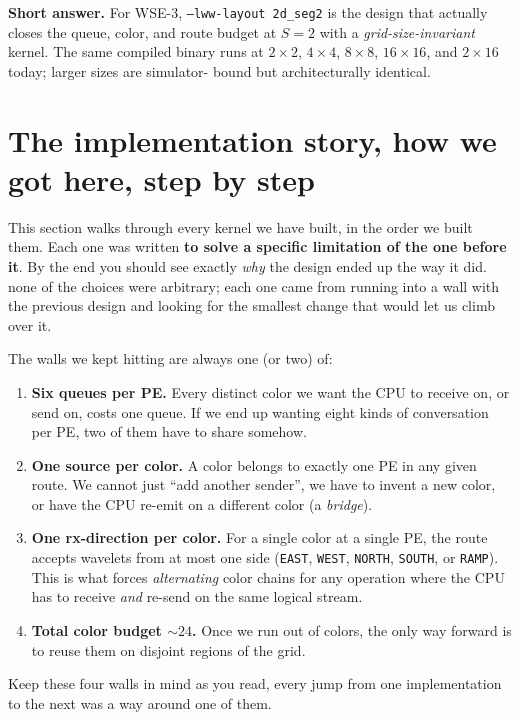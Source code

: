 \documentclass[11pt]{article}
\newcommand{\code}[1]{\texttt{#1}}
\begin{document}
\textbf{Short answer.} For WSE-3, \code{--lww-layout 2d\_seg2} is
the design that actually closes the queue, color, and route budget
at $S=2$ with a \emph{grid-size-invariant} kernel. The same
compiled binary runs at $2\times 2$, $4\times 4$, $8\times 8$,
$16\times 16$, and $2\times 16$ today; larger sizes are simulator-
bound but architecturally identical.

\section{The implementation story, how we got here, step by step}

This section walks through every kernel we have built, in the
order we built them. Each one was written \textbf{to solve a
specific limitation of the one before it}. By the end you should
see exactly \emph{why} the design ended up the way it did.
none of the choices were arbitrary; each one came from running
into a wall with the previous design and looking for the smallest
change that would let us climb over it.

The walls we kept hitting are always one (or two) of:

\begin{enumerate}[leftmargin=1.3em,itemsep=0.15em]
  \item \textbf{Six queues per PE.} Every distinct color we want
    the CPU to receive on, or send on, costs one queue. If we end
    up wanting eight kinds of conversation per PE, two of them
    have to share somehow.
  \item \textbf{One source per color.} A color belongs to exactly
    one PE in any given route. We cannot just ``add another
    sender'', we have to invent a new color, or have the CPU
    re-emit on a different color (a \emph{bridge}).
  \item \textbf{One rx-direction per color.} For a single color
    at a single PE, the route accepts wavelets from at most one
    side (\code{EAST}, \code{WEST}, \code{NORTH}, \code{SOUTH},
    or \code{RAMP}). This is what forces \emph{alternating}
    color chains for any operation where the CPU has to receive
    \emph{and} re-send on the same logical stream.
  \item \textbf{Total color budget $\sim\!24$.} Once we run out
    of colors, the only way forward is to reuse them on
    disjoint regions of the grid.
\end{enumerate}

Keep these four walls in mind as you read, every jump from one
implementation to the next was a way around one of them.
\end{document}
